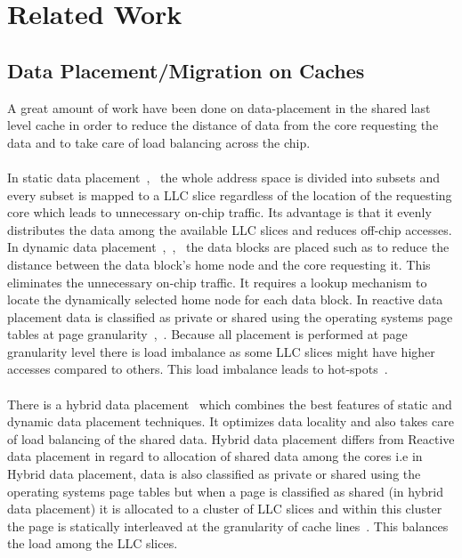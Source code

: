 \documentclass{listhesis}
\begin{document}
\section{Related Work}
\subsection{Data Placement/Migration on Caches}
A great amount of work have been done on data-placement in the shared last level cache in order to reduce the distance of data from the core requesting the data and to take care of load balancing across the chip.\\
\\
In static data placement~\cite{cacheDataPlacement1},~\cite{cacheDataPlacement2} the whole address space is divided into subsets and every subset is mapped to a LLC slice regardless of the location of the requesting core which leads to unnecessary on-chip traffic. Its advantage is that it evenly distributes the data among the available LLC slices and reduces off-chip accesses. In dynamic data placement~\cite{cacheDataPlacement1},~\cite{cacheDataPlacement3},~\cite{cacheDataPlacement4} the data blocks are placed such as to reduce the distance between the data block's home node and the core requesting it. This eliminates the unnecessary on-chip traffic. It requires a lookup mechanism to locate the dynamically selected home node for each data block. In reactive data placement data is classified as private or shared using the operating systems page tables at page granularity~\cite{cacheDataPlacement4},~\cite{cacheDataPlacement6}. Because all placement is performed at page granularity level there is load imbalance as some LLC slices might have higher accesses compared to others. This load imbalance leads to hot-spots~\cite{cacheDataPlacement6}.\\
\\
There is a hybrid data placement~\cite{cacheDataPlacement6} which combines the best features of static and dynamic data placement techniques. It optimizes data locality and also takes care of load balancing of the shared data. Hybrid data placement differs from Reactive data placement in regard to allocation of shared data among the cores i.e in Hybrid data placement, data is also classified as private or shared using the operating systems page tables but when a page is classified as shared (in hybrid data placement) it is allocated to a cluster of LLC slices and within this cluster the page is statically interleaved at the granularity of cache lines~\cite{cacheDataPlacement6}. This balances the load among the LLC slices.\\
\end{document}

